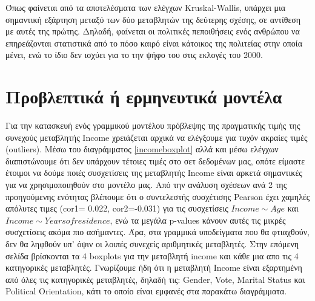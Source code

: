 \documentclass[10pt, letterpaper]{article}
\begin{document}
            \par Όπως φαίνεται από τα αποτελέσματα των ελέγχων Kruskal-Wallis, υπάρχει μια σημαντική εξάρτηση μεταξύ των δύο μεταβλητών της δεύτερης σχέσης, σε αντίθεση με αυτές της πρώτης. Δηλαδή, φαίνεται οι πολιτικές πεποιθήσεις ενός ανθρώπου να επηρεάζονται στατιστικά από το πόσο καιρό είναι κάτοικος της πολιτείας στην οποία μένει, ενώ το ίδιο δεν ισχύει για το την ψήφο του στις εκλογές του 2000.

            
    \section{Προβλεπτικά ή ερμηνευτικά μοντέλα}

        \par Για την κατασκευή ενός γραμμικού μοντέλου πρόβλεψης της πραγματικής τιμής της συνεχούς μεταβλητής Income χρειάζεται αρχικά να ελέγξουμε για τυχόν ακραίες τιμές (outliers). Μέσω του διαγράμματος \ref{incomeboxplot} αλλά και μέσω ελέγχων διαπιστώνουμε ότι δεν υπάρχουν τέτοιες τιμές στο σετ δεδομένων μας, οπότε είμαστε έτοιμοι να δούμε ποιές συσχετίσεις της μεταβλητής Income είναι αρκετά σημαντικές για να χρησιμοποιηθούν στο μοντέλο μας. Από την ανάλυση σχέσεων ανά 2 της προηγούμενης ενότητας βλέπουμε ότι ο συντελεστής συσχέτισης Pearson έχει χαμηλές απόλυτες τιμες (cor1= 0.022, cor2=-0.031) για τις συσχετίσεις $Income \sim Age$ και $Income \sim Years of residence$, ενώ τα μεγάλα p-values κάνουν αυτές τις μικρές συσχετίσεις ακόμα πιο ασήμαντες. Άρα, στα γραμμικά υποδείγματα που θα φτιαχθούν, δεν θα ληφθούν υπ' όψιν οι λοιπές συνεχείς αριθμητικές μεταβλητές. Στην επόμενη σελίδα βρίσκονται τα 4 boxplots για την μεταβλητή income και κάθε μια απο τις 4 κατηγορικές μεταβλητές. Γνωρίζουμε ήδη ότι η μεταβλητή Income είναι εξαρτημένη από όλες τις κατηγορικές μεταβλητές, δηλαδή τις: Gender, Vote, Marital Status και Political Orientation, κάτι το οποίο είναι εμφανές στα παρακάτω διαγράμματα.

        \newpage
\end{document}
